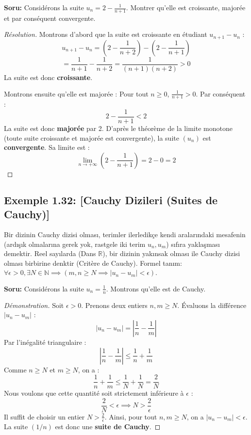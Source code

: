 \documentclass[12pt,a4paper]{report}
\begin{document}
\textbf{Soru:}
Considérons la suite $u_n = 2 - \frac{1}{n+1}$. Montrer qu'elle est croissante, majorée et par conséquent convergente.

\begin{proof}[Résolution]
Montrons d'abord que la suite est croissante en étudiant $u_{n+1} - u_n$ :
\[ u_{n+1} - u_n = \left(2 - \frac{1}{n+2}\right) - \left(2 - \frac{1}{n+1}\right) \]
\[ = \frac{1}{n+1} - \frac{1}{n+2} = \frac{1}{(n+1)(n+2)} > 0 \]
La suite est donc \textbf{croissante}.

Montrons ensuite qu'elle est majorée :
Pour tout $n \ge 0$, $\frac{1}{n+1} > 0$. Par conséquent :
\[ 2 - \frac{1}{n+1} < 2 \]
La suite est donc \textbf{majorée} par 2.
D'après le théorème de la limite monotone (toute suite croissante et majorée est convergente), la suite $(u_n)$ est \textbf{convergente}. Sa limite est :
\[ \lim_{n \to +\infty} \left(2 - \frac{1}{n+1}\right) = 2 - 0 = 2 \]
\end{proof}

\subsection*{Exemple 1.32: [Cauchy Dizileri (Suites de Cauchy)]}

\begin{tcolorbox}[colback=brown!5!white,colframe=brown!75!black,title=Hatırlatma (Rappel): Cauchy Dizisi]
Bir dizinin Cauchy dizisi olması, terimler ilerledikçe kendi aralarındaki mesafenin (ardışık olmalarına gerek yok, rastgele iki terim $u_n, u_m$) sıfıra yaklaşması demektir.
Reel sayılarda (Dans $\mathbb{R}$), bir dizinin yakınsak olması ile Cauchy dizisi olması birbirine denktir (Critère de Cauchy). 
Formel tanım: $\forall \epsilon > 0, \exists N \in \mathbb{N} \implies (m, n \ge N \implies |u_n - u_m| < \epsilon)$.
\end{tcolorbox}

\textbf{Soru:}
Considérons la suite $u_n = \frac{1}{n}$. Montrons qu'elle est de Cauchy.

\begin{proof}[Démonstration]
Soit $\epsilon > 0$. Prenons deux entiers $n, m \ge N$.
Évaluons la différence $|u_n - u_m|$ :
\[ |u_n - u_m| = \left| \frac{1}{n} - \frac{1}{m} \right| \]
Par l'inégalité triangulaire :
\[ \left| \frac{1}{n} - \frac{1}{m} \right| \le \frac{1}{n} + \frac{1}{m} \]
Comme $n \ge N$ et $m \ge N$, on a :
\[ \frac{1}{n} + \frac{1}{m} \le \frac{1}{N} + \frac{1}{N} = \frac{2}{N} \]
Nous voulons que cette quantité soit strictement inférieure à $\epsilon$ :
\[ \frac{2}{N} < \epsilon \implies N > \frac{2}{\epsilon} \]
Il suffit de choisir un entier $N > \frac{2}{\epsilon}$. Ainsi, pour tout $n, m \ge N$, on a $|u_n - u_m| < \epsilon$.
La suite $(1/n)$ est donc une \textbf{suite de Cauchy}.
\end{proof}
\end{document}
